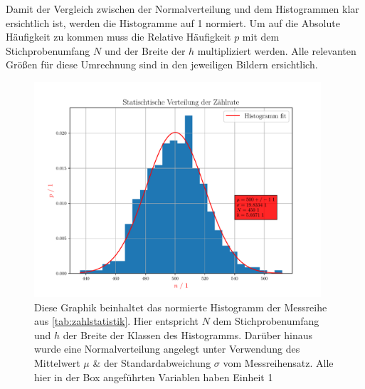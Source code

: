 \documentclass[12pt,english,ngerman]{scrartcl}
\begin{document}
Damit der Vergleich zwischen der Normalverteilung und dem Histogrammen klar
ersichtlich ist, werden die Histogramme auf 1 normiert. Um auf die Absolute
Häufigkeit zu kommen muss die Relative Häufigkeit $p$ mit dem Stichprobenumfang
$N$ und der Breite der $h$ multipliziert werden. Alle relevanten Größen für
diese Umrechnung sind in den jeweiligen Bildern ersichtlich.

\begin{figure}[H]
	\begin{center}
		\includegraphics[width=0.95\textwidth]{./figures/5statistik.pdf}
	\end{center}
	\caption[Histogramm der Zählstatistik mit Klassen der Größe 5]{Diese Graphik
		beinhaltet das normierte Histogramm der Messreihe aus
		\autoref{tab:zahlstatistik}. Hier entspricht $N$ dem Stichprobenumfang und
		$h$ der Breite der Klassen des Histogramms. Darüber hinaus wurde eine
		Normalverteilung angelegt unter Verwendung des Mittelwert $\mu$ \& der
		Standardabweichung $\sigma$ vom Messreihensatz. Alle hier in der Box
		angeführten Variablen haben Einheit 1}\label{fig:5statistik}
\end{figure}
\end{document}
